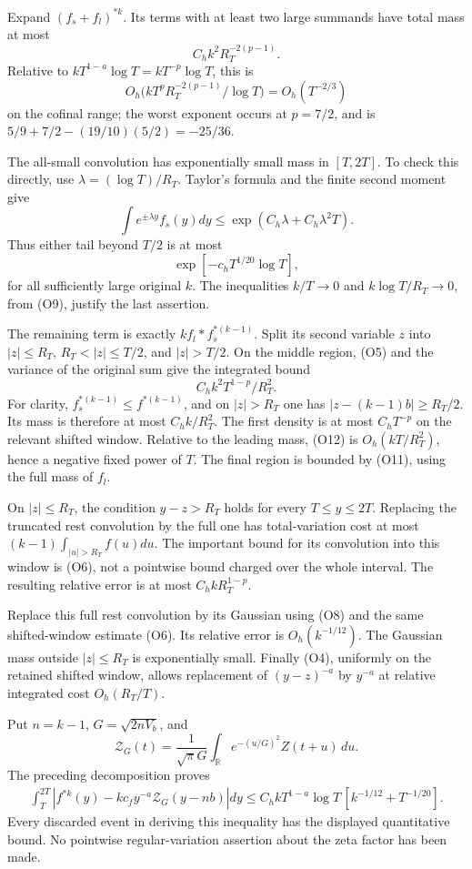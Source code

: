\documentclass[
  11pt,
]{article}
\begin{document}
Expand \((f_s+f_l)^{*k}\). Its terms with at least two large summands
have total mass at most \[
C_h k^2R_T^{-2(p-1)}.\tag{O10}
\] Relative to \(kT^{1-a}\log T=kT^{-p}\log T\), this is \[
O_h\bigl(kT^pR_T^{-2(p-1)}/\log T\bigr)=O_h(T^{-2/3})
\] on the cofinal range; the worst exponent occurs at \(p=7/2\), and is
\(5/9+7/2-(19/10)(5/2)=-25/36\).

The all-small convolution has exponentially small mass in \([T,2T]\). To
check this directly, use \(\lambda=(\log T)/R_T\). Taylor's formula and
the finite second moment give \[
\int e^{\pm\lambda y}f_s(y)dy
\le\exp(C_h\lambda+C_h\lambda^2T).
\] Thus either tail beyond \(T/2\) is at most \[
\exp[-c_hT^{1/20}\log T],\tag{O11}
\] for all sufficiently large original \(k\). The inequalities
\(k/T\to0\) and \(k\log T/R_T\to0\), from (O9), justify the last
assertion.

The remaining term is exactly \(k f_l*f_s^{*(k-1)}\). Split its second
variable \(z\) into \(|z|\le R_T\), \(R_T<|z|\le T/2\), and \(|z|>T/2\).
On the middle region, (O5) and the variance of the original sum give the
integrated bound \[
C_h k^2T^{1-p}/R_T^2.\tag{O12}
\] For clarity, \(f_s^{*(k-1)}\le f^{*(k-1)}\), and on \(|z|>R_T\) one
has \(|z-(k-1)b|\ge R_T/2\). Its mass is therefore at most
\(C_h k/R_T^2\). The first density is at most \(C_hT^{-p}\) on the
relevant shifted window. Relative to the leading mass, (O12) is
\(O_h(kT/R_T^2)\), hence a negative fixed power of \(T\). The final
region is bounded by (O11), using the full mass of \(f_l\).

On \(|z|\le R_T\), the condition \(y-z>R_T\) holds for every
\(T\le y\le2T\). Replacing the truncated rest convolution by the full
one has total-variation cost at most \((k-1)\int_{|u|>R_T}f(u)du\). The
important bound for its convolution into this window is (O6), not a
pointwise bound charged over the whole interval. The resulting relative
error is at most \(C_h kR_T^{1-p}\).

Replace this full rest convolution by its Gaussian using (O8) and the
same shifted-window estimate (O6). Its relative error is
\(O_h(k^{-1/12})\). The Gaussian mass outside \(|z|\le R_T\) is
exponentially small. Finally (O4), uniformly on the retained shifted
window, allows replacement of \((y-z)^{-a}\) by \(y^{-a}\) at relative
integrated cost \(O_h(R_T/T)\).

Put \(n=k-1\), \(G=\sqrt{2nV_b}\), and \[
\mathcal Z_G(t)=\frac1{\sqrt\pi G}
\int_{\mathbb R}e^{-(u/G)^2}Z(t+u)\,du.
\] The preceding decomposition proves \[
\boxed{\begin{aligned}
\int_T^{2T}\left|f^{*k}(y)-kc_fy^{-a}
\mathcal Z_G(y-nb)\right|dy
\le C_h kT^{1-a}\log T\,[k^{-1/12}+T^{-1/20}].
\end{aligned}}\tag{O13}
\] Every discarded event in deriving this inequality has the displayed
quantitative bound. No pointwise regular-variation assertion about the
zeta factor has been made.
\end{document}
